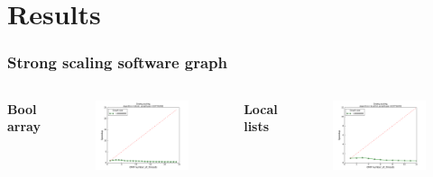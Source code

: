 \section{Results}

\begin{frame}
\frametitle{Strong scaling software graph}
\begin{columns}[T]
  \bfseries{Bool array}
  \begin{figure}[!ht]
    \begin{center}
      \includegraphics[width=\textwidth]{img/strongscaling_bitset_gtSOFTWARE_opt1.pdf}
    \end{center}
  \end{figure}

  \bfseries{Local lists}
  \begin{figure}[!ht]
    \begin{center}
      \includegraphics[width=\textwidth]{img/strongscaling_locallist_gtSOFTWARE_opt0.pdf}
    \end{center}
  \end{figure}
\end{columns}
\end{frame}


